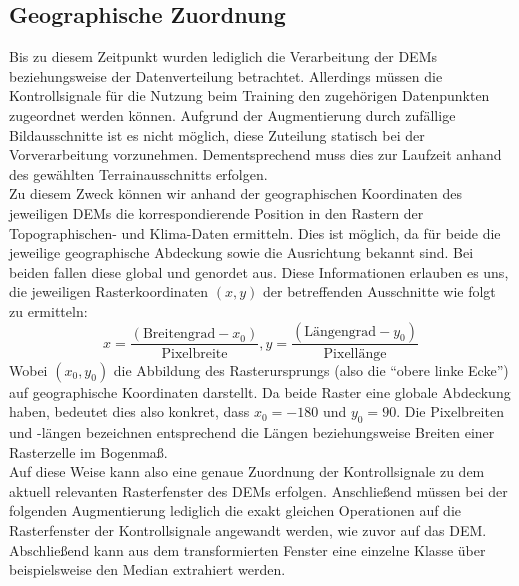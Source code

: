 \subsection{Geographische Zuordnung}

Bis zu diesem Zeitpunkt wurden lediglich die Verarbeitung der \ac{DEM}s beziehungsweise der Datenverteilung betrachtet. Allerdings müssen die Kontrollsignale für die Nutzung beim Training den zugehörigen Datenpunkten zugeordnet werden können. Aufgrund der Augmentierung durch zufällige Bildausschnitte ist es nicht möglich, diese Zuteilung statisch bei der Vorverarbeitung vorzunehmen. Dementsprechend muss dies zur Laufzeit anhand des gewählten Terrainausschnitts erfolgen. \\
Zu diesem Zweck können wir anhand der geographischen Koordinaten des jeweiligen \ac{DEM}s die korrespondierende Position in den Rastern der Topographischen- und Klima-Daten ermitteln. Dies ist möglich, da für beide die jeweilige geographische Abdeckung sowie die Ausrichtung bekannt sind. Bei beiden fallen diese global und genordet aus. Diese Informationen erlauben es uns, die jeweiligen Rasterkoordinaten $(x,y)$ der betreffenden Ausschnitte wie folgt zu ermitteln:
\begin{equation}
    x = \frac{(\text{Breitengrad} - x_0)}{\text{Pixelbreite}}, 
    y = \frac{(\text{Längengrad} - y_0)}{\text{Pixellänge}}
\end{equation}
Wobei $(x_0, y_0)$ die Abbildung des Rasterursprungs (also die \enquote{obere linke Ecke}) auf geographische Koordinaten darstellt. Da beide Raster eine globale Abdeckung haben, bedeutet dies also konkret, dass $x_0 = -180$ und $y_0 = 90$. Die Pixelbreiten und -längen bezeichnen entsprechend die Längen beziehungsweise Breiten einer Rasterzelle im Bogenmaß. \\
Auf diese Weise kann also eine genaue Zuordnung der Kontrollsignale zu dem aktuell relevanten Rasterfenster des \ac{DEM}s erfolgen. Anschließend müssen bei der folgenden Augmentierung lediglich die exakt gleichen Operationen auf die Rasterfenster der Kontrollsignale angewandt werden, wie zuvor auf das \ac{DEM}. Abschließend kann aus dem transformierten Fenster eine einzelne Klasse über beispielsweise den Median extrahiert werden. 